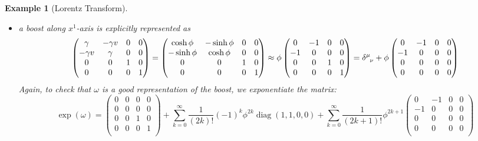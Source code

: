 \documentclass[a4paper]{article}
\DeclareMathOperator{\diag}{diag}
\newtheorem{eg}{Example}[section]
\theoremstyle{new}
\begin{document}
\begin{eg}[Lorentz Transform]
\begin{itemize}
    To check that $\omega$ is a good representation of the rotation, we exponentiate the matrix:
    $$\exp(\omega)=\begin{pmatrix}1&0&0&0\\0&0&0&0\\0&0&0&0\\0&0&0&1\\\end{pmatrix}+\sum_{k=0}^\infty\frac{1}{(2k)!}(-1)^k\theta^{2k}\diag(0,1,1,0)+\sum_{k=0}^\infty\frac{1}{(2k+1)!}(-1)^k\theta^{2k+1}\begin{pmatrix}0&0&0&0\\0&0&+1&0\\0&-1&0&0\\0&0&0&0\\\end{pmatrix}$$
    Upon identifying the series expansions as $\cos\theta$ and $\sin\theta$, we recover our rotation matrix.
    \item a boost along $x^1$-axis is explicitly represented as
    $$\begin{pmatrix}\gamma&-\gamma v&0&0\\-\gamma v&\gamma&0&0\\0&0&1&0\\0&0&0&1\\\end{pmatrix}=\begin{pmatrix}\cosh\phi&-\sinh\phi&0&0\\-\sinh\phi&\cosh\phi&0&0\\0&0&1&0\\0&0&0&1\\\end{pmatrix}\approx\phi\begin{pmatrix}0&-1&0&0\\-1&0&0&0\\0&0&1&0\\0&0&0&1\\\end{pmatrix}=\tensor*{\delta}{*_{}^{\mu}_{\nu}}+\phi\begin{pmatrix}0&-1&0&0\\-1&0&0&0\\0&0&0&0\\0&0&0&0\\\end{pmatrix}$$
    Again, to check that $\omega$ is a good representation of the boost, we exponentiate the matrix:
    $$\exp(\omega)=\begin{pmatrix}0&0&0&0\\0&0&0&0\\0&0&1&0\\0&0&0&1\\\end{pmatrix}+\sum_{k=0}^\infty\frac{1}{(2k)!}(-1)^k\phi^{2k}\diag(1,1,0,0)+\sum_{k=0}^\infty\frac{1}{(2k+1)!}\phi^{2k+1}\begin{pmatrix}0&-1&0&0\\-1&0&0&0\\0&0&0&0\\0&0&0&0\\\end{pmatrix}$$

\end{itemize}
\end{eg}
\end{document}

